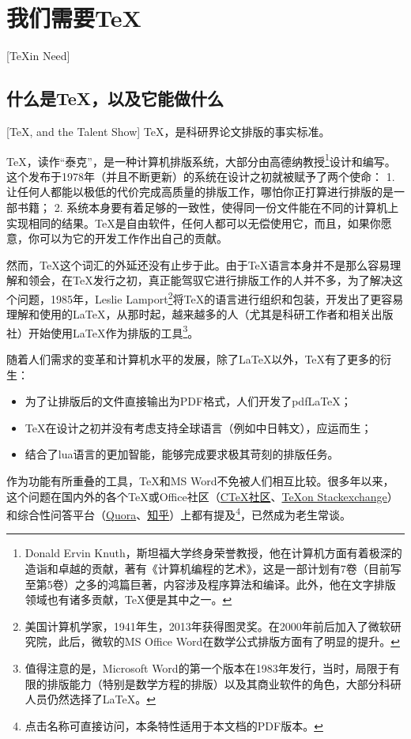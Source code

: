 \section{我们需要\TeX}[\TeX in Need]
\subsection{什么是\TeX ，以及它能做什么}[\TeX , and the Talent Show]\label{sec:whatistex}
\TeX ，是科研界论文排版的事实标准。

\TeX ，读作“泰克”，是一种计算机排版系统，大部分由高德纳教授\footnote{Donald Ervin Knuth，斯坦福大学终身荣誉教授，他在计算机方面有着极深的造诣和卓越的贡献，著有《计算机编程的艺术》\cite{Knuth:ACPV1,Knuth:ACPV2,Knuth:ACPV3}，这是一部计划有7卷（目前写至第5卷）之多的鸿篇巨著，内容涉及程序算法和编译。此外，他在文字排版领域也有诸多贡献，\TeX 便是其中之一。}设计和编写。这个发布于1978年（并且不断更新）的系统在设计之初就被赋予了两个使命：
1. 让任何人都能以极低的代价完成高质量的排版工作，哪怕你正打算进行排版的是一部书籍；
2. 系统本身要有着足够的一致性，使得同一份文件能在不同的计算机上实现相同的结果。\TeX 是自由软件，任何人都可以无偿使用它，而且，如果你愿意，你可以为它的开发工作作出自己的贡献。

然而，\TeX 这个词汇的外延还没有止步于此。由于\TeX 语言本身并不是那么容易理解和领会，在\TeX 发行之初，真正能驾驭它进行排版工作的人并不多，为了解决这个问题，1985年，Leslie Lamport\footnote{美国计算机学家，1941年生，2013年获得图灵奖。在2000年前后加入了微软研究院，此后，微软的MS Office Word在数学公式排版方面有了明显的提升。}将\TeX 的语言进行组织和包装，开发出了更容易理解和使用的\LaTeX ，从那时起，越来越多的人（尤其是科研工作者和相关出版社）开始使用\LaTeX 作为排版的工具\footnote{值得注意的是，Microsoft Word的第一个版本在1983年发行，当时，局限于有限的排版能力（特别是数学方程的排版）以及其商业软件的角色，大部分科研人员仍然选择了\LaTeX 。}。

随着人们需求的变革和计算机水平的发展，除了\LaTeX 以外，\TeX 有了更多的衍生：

\begin{itemize}
	\item 为了让排版后的文件直接输出为PDF格式，人们开发了pdf\LaTeX ；
	\item \TeX  在设计之初并没有考虑支持全球语言（例如中日韩文），\XeLaTeX 应运而生；
	\item 结合了lua语言的\LuaLaTeX 更加智能，能够完成要求极其苛刻的排版任务。
\end{itemize}

作为功能有所重叠的工具，\TeX 和MS Word不免被人们相互比较。很多年以来，这个问题在国内外的各个\TeX 或Office社区（\href{www.ctex.org}{C\TeX 社区}、\href{tex.stackexchange.com}{\TeX on Stackexchange}）和综合性问答平台（\href{www.quora.com}{Quora}、\href{www.zhihu.com}{知乎}）上都有提及\footnote{点击名称可直接访问，本条特性适用于本文档的PDF版本。}，已然成为老生常谈。

